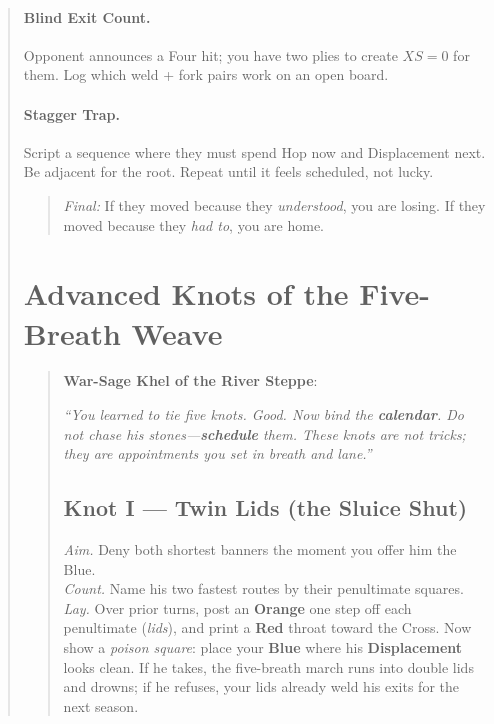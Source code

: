 \documentclass[11pt]{article}
\begin{document}
\begin{quote}
\paragraph{Blind Exit Count.} Opponent announces a Four hit; you have two plies to create $XS=0$ for them. Log which weld + fork pairs work on an open board.
\paragraph{Stagger Trap.} Script a sequence where they must spend Hop now and Displacement next. Be adjacent for the root. Repeat until it feels scheduled, not lucky.

\begin{quote}\small
\emph{Final:} If they moved because they \emph{understood}, you are losing. If they moved because they \emph{had to}, you are home.
\end{quote}

\section{Advanced Knots of the Five-Breath Weave}
\label{sec:advanced-weave}

\begin{quote}\small
\textbf{War-Sage Khel of the River Steppe}:

\medskip
\emph{“You learned to tie five knots. Good. Now bind the \textbf{calendar}. Do not chase his stones—\textbf{schedule} them. These knots are not tricks; they are appointments you set in breath and lane.”}

\subsection*{Knot I — Twin Lids (the Sluice Shut)}
\emph{Aim.} Deny both shortest banners the moment you offer him the Blue.\\
\emph{Count.} Name his two fastest routes by their penultimate squares.\\
\emph{Lay.} Over prior turns, post an \textbf{Orange} one step off each penultimate (\emph{lids}), and print a \textbf{Red} throat toward the Cross. Now show a \emph{poison square}: place your \textbf{Blue} where his \textbf{Displacement} looks clean. If he takes, the five-breath march runs into double lids and drowns; if he refuses, your lids already weld his exits for the next season.


\end{quote}
\end{quote}
\end{document}
